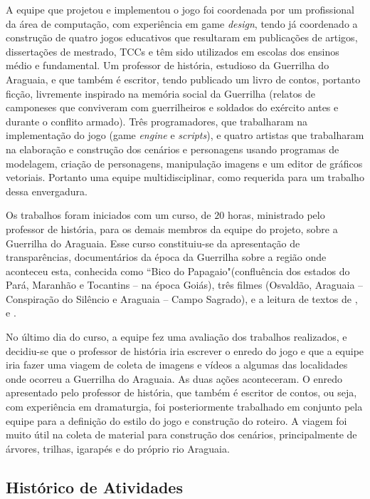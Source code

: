 A equipe que projetou e implementou o jogo foi coordenada por um profissional da área de computação, com experiência em game \textit{design}, tendo já coordenado a construção de quatro jogos educativos que resultaram em publicações de artigos, dissertações de mestrado, TCCs e têm sido utilizados em escolas dos ensinos médio e fundamental. Um professor de história, estudioso da Guerrilha do Araguaia, e que também é escritor, tendo publicado um livro de contos, portanto ficção, livremente inspirado na memória social da Guerrilha (relatos de camponeses que conviveram com guerrilheiros e soldados do exército antes e durante o conflito armado). Três programadores, que trabalharam na implementação do jogo (game \textit{engine} e \textit{scripts}), e quatro artistas que trabalharam na elaboração e construção dos cenários e personagens usando programas de modelagem, criação de personagens, manipulação imagens e um editor de gráficos vetoriais. Portanto uma equipe multidisciplinar, como requerida para um trabalho dessa envergadura.

Os trabalhos foram iniciados com um curso, de $20$ horas, ministrado pelo professor de história, para os demais membros da equipe do projeto, sobre a Guerrilha do Araguaia. Esse curso constituiu-se da apresentação de transparências, documentários da época da Guerrilha sobre a região onde aconteceu esta, conhecida como ``Bico do Papagaio"\space (confluência dos estados do Pará, Maranhão e Tocantins -- na época Goiás), três filmes (Osvaldão, Araguaia -- Conspiração do Silêncio e Araguaia -- Campo Sagrado), e a leitura de textos de ,  e .

No último dia do curso, a equipe fez uma avaliação dos trabalhos realizados, e decidiu-se que o professor de história iria escrever o enredo do jogo e que a equipe iria fazer uma viagem de coleta de imagens e vídeos a algumas das localidades onde ocorreu a Guerrilha do Araguaia. As duas ações aconteceram. O enredo apresentado pelo professor de história, que também é escritor de contos, ou seja, com experiência em dramaturgia, foi posteriormente trabalhado em conjunto pela equipe para a definição do estilo do jogo e construção do roteiro. A viagem foi muito útil na coleta de material para construção dos cenários, principalmente de árvores, trilhas, igarapés e do próprio rio Araguaia.

\subsection{Histórico de Atividades}

